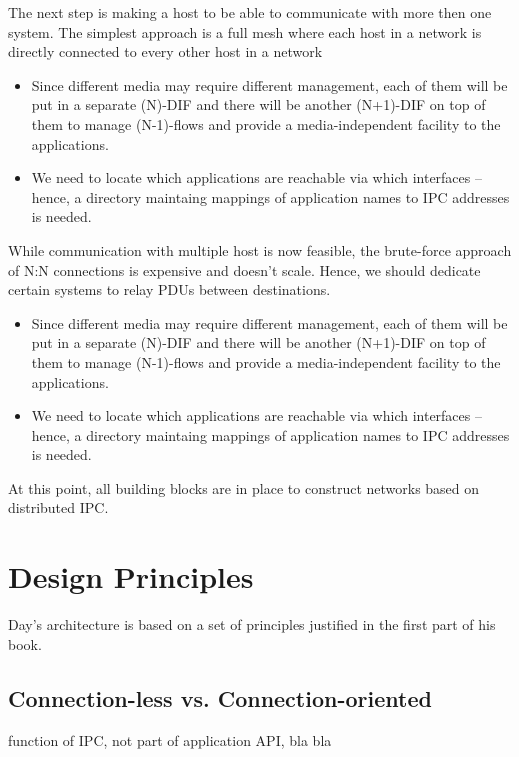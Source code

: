         The next step is making a host to be able to communicate with more then one system. The simplest approach is a full mesh where each host in a network is directly connected to every other host in a network
        \vspace{300pt}
        \begin{itemize}
        \item Since different media may require different management, each of them will be put in a separate (N)-DIF and there will be another (N+1)-DIF on top of them to manage (N-1)-flows and provide a media-independent facility to the applications.
        \item We need to locate which applications are reachable via which interfaces -- hence, a directory maintaing mappings of application names to IPC addresses is needed.
        \end{itemize}

        While communication with multiple host is now feasible, the brute-force approach of N:N connections is expensive and doesn't scale. Hence, we should dedicate certain systems to relay PDUs between destinations.
        \vspace{300pt}
        \begin{itemize}
        \item Since different media may require different management, each of them will be put in a separate (N)-DIF and there will be another (N+1)-DIF on top of them to manage (N-1)-flows and provide a media-independent facility to the applications.
        \item We need to locate which applications are reachable via which interfaces -- hence, a directory maintaing mappings of application names to IPC addresses is needed.
        \end{itemize}

        At this point, all building blocks are in place to construct networks based on distributed IPC.

    \section{Design Principles}
        Day's architecture is based on a set of principles justified in the first part of his book.

        \subsection{Connection-less vs. Connection-oriented}
            function of IPC, not part of application API, bla bla

